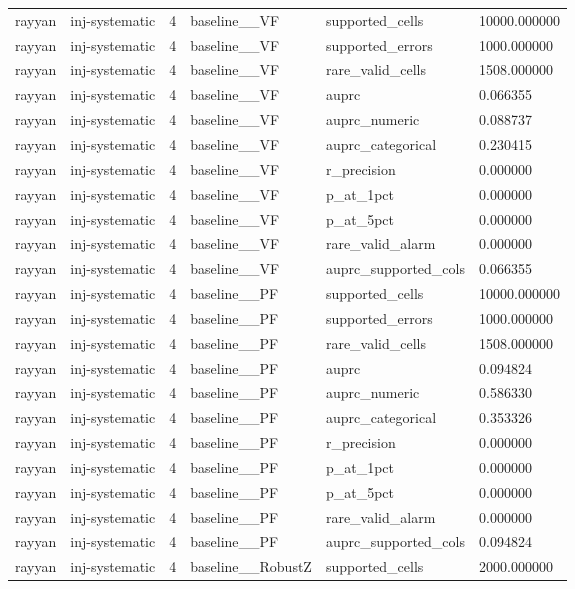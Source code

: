 \begin{tabular}{llllll}
rayyan & inj-systematic & 4 & baseline\_\_VF & supported\_cells & 10000.000000 \\
rayyan & inj-systematic & 4 & baseline\_\_VF & supported\_errors & 1000.000000 \\
rayyan & inj-systematic & 4 & baseline\_\_VF & rare\_valid\_cells & 1508.000000 \\
rayyan & inj-systematic & 4 & baseline\_\_VF & auprc & 0.066355 \\
rayyan & inj-systematic & 4 & baseline\_\_VF & auprc\_numeric & 0.088737 \\
rayyan & inj-systematic & 4 & baseline\_\_VF & auprc\_categorical & 0.230415 \\
rayyan & inj-systematic & 4 & baseline\_\_VF & r\_precision & 0.000000 \\
rayyan & inj-systematic & 4 & baseline\_\_VF & p\_at\_1pct & 0.000000 \\
rayyan & inj-systematic & 4 & baseline\_\_VF & p\_at\_5pct & 0.000000 \\
rayyan & inj-systematic & 4 & baseline\_\_VF & rare\_valid\_alarm & 0.000000 \\
rayyan & inj-systematic & 4 & baseline\_\_VF & auprc\_supported\_cols & 0.066355 \\
rayyan & inj-systematic & 4 & baseline\_\_PF & supported\_cells & 10000.000000 \\
rayyan & inj-systematic & 4 & baseline\_\_PF & supported\_errors & 1000.000000 \\
rayyan & inj-systematic & 4 & baseline\_\_PF & rare\_valid\_cells & 1508.000000 \\
rayyan & inj-systematic & 4 & baseline\_\_PF & auprc & 0.094824 \\
rayyan & inj-systematic & 4 & baseline\_\_PF & auprc\_numeric & 0.586330 \\
rayyan & inj-systematic & 4 & baseline\_\_PF & auprc\_categorical & 0.353326 \\
rayyan & inj-systematic & 4 & baseline\_\_PF & r\_precision & 0.000000 \\
rayyan & inj-systematic & 4 & baseline\_\_PF & p\_at\_1pct & 0.000000 \\
rayyan & inj-systematic & 4 & baseline\_\_PF & p\_at\_5pct & 0.000000 \\
rayyan & inj-systematic & 4 & baseline\_\_PF & rare\_valid\_alarm & 0.000000 \\
rayyan & inj-systematic & 4 & baseline\_\_PF & auprc\_supported\_cols & 0.094824 \\
rayyan & inj-systematic & 4 & baseline\_\_RobustZ & supported\_cells & 2000.000000 \\

\end{tabular}
